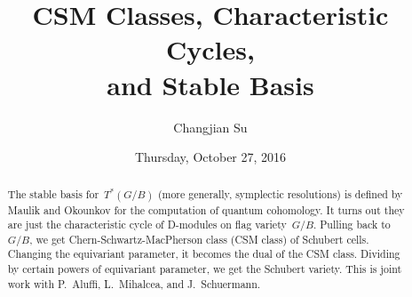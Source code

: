\documentclass{UAmathtalk}
\author{Changjian Su}
\title{CSM Classes, Characteristic Cycles,\\ and Stable Basis}
\date{Thursday, October 27, 2016}
\begin{document}
\maketitle

\begin{abstract}
The stable basis for~$T^*(G/B)$ (more generally, symplectic resolutions) is defined by Maulik and Okounkov for the computation of quantum cohomology. It turns out they are just the characteristic cycle of D-modules on flag variety~$G/B$. Pulling back to~$G/B$, we get Chern-Schwartz-MacPherson class (CSM class) of Schubert cells. Changing the equivariant parameter, it becomes the dual of the CSM class. Dividing by certain powers of equivariant parameter, we get the Schubert variety. This is joint work with P.~Aluffi, L.~Mihalcea, and J.~Schuermann.
\end{abstract}
\end{document}
